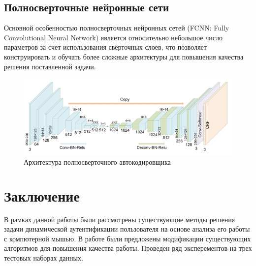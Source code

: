 \documentclass[12pt]{article}
\begin{document}
    \subsection{Полносверточные нейронные сети}
    \label{sec:Future:FCNN}

    \par Основной особенностью полносверточных нейронных сетей (FCNN: Fully Convolutional Neural Network) является относительно небольшое число параметров за счет использования сверточных слоев, что позволяет конструировать и обучать более сложные архитектуры для повышения качества решения поставленной задачи.

    \begin{figure}[h!]
        \centering
        \includegraphics[width=0.9\linewidth]{FCNN.png}
        \caption{Архитектура полносверточного автокодировщика}
        \label{sec:Future:FCNN:fig:FCNN}
    \end{figure}

    \newpage



    \section{Заключение}
    \label{sec:Conclusion}

    \par В рамках данной работы были рассмотрены существующие методы решения задачи динамической аутентификации пользователя на основе анализа его работы с компютерной мышью. В работе были предложены модификации существующих алгоритмов для повышения качества работы. Проведен ряд эксперементов на трех тестовых наборах данных.

    \newpage
\end{document}
